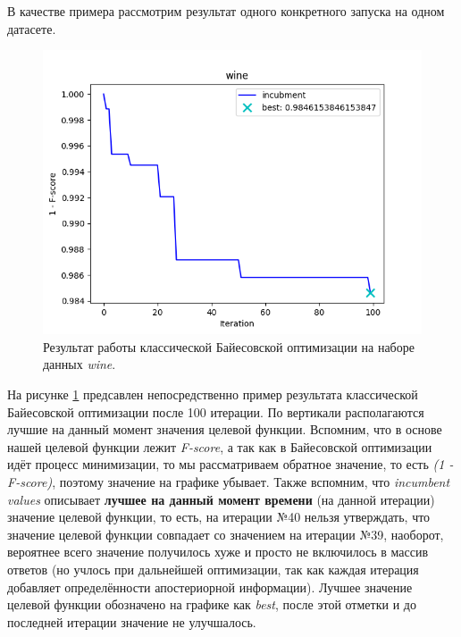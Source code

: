 \documentclass[times,specification,annotation]{itmo-student-thesis}
\begin{document}
	В качестве примера рассмотрим результат одного конкретного запуска на одном датасете.
	\begin{figure}[!ht]
		\caption{Результат работы классической Байесовской оптимизации на наборе данных \textit{wine}.}\label{img:bo-wine}
		\includegraphics[width=0.85\linewidth]{../png/incubment-iteration/wine}
		\centering
	\end{figure}
	На рисунке \ref{img:bo-wine} предсавлен непосредственно пример результата классической Байесовской оптимизации после 100 итерации. По вертикали располагаются лучшие на данный момент значения целевой функции. Вспомним, что в основе нашей целевой функции лежит \textit{F-score}, а так как в Байесовской оптимизации идёт процесс минимизации, то мы рассматриваем обратное значение, то есть \textit{(1 - F-score)}, поэтому значение на графике убывает. Также вспомним, что \textit{incumbent values} описывает \textbf{лучшее на данный момент времени} (на данной итерации) значение целевой функции, то есть, на итерации №40 нельзя утверждать, что значение целевой функции совпадает со значением на итерации №39, наоборот, вероятнее всего значение получилось хуже и просто не включилось в массив ответов (но учлось при дальнейшей оптимизации, так как каждая итерация добавляет определённости апостериорной информации). Лучшее значение целевой функции обозначено на графике как \textit{best}, после этой отметки и до последней итерации значение не улучшалось. \par 
	
\end{document}
